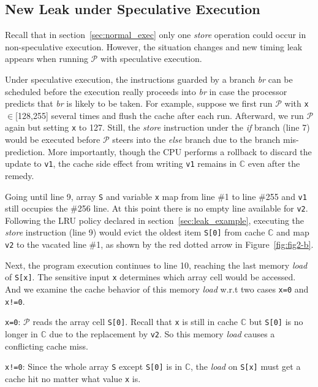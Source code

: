 \documentclass[sigconf]{acmart}
\newcommand{\prog}{\mathcal{P}}
\begin{document}
\subsection{New Leak under Speculative Execution}
\label{sec:specu_leak}

Recall that in section~\ref{sec:normal_exec} only one \textit{store} operation 
could occur in non-speculative execution. However, the situation changes and 
new timing leak appears when running $\prog$ with speculative execution.  


Under speculative execution, the instructions guarded by a branch \emph{br} 
can be scheduled before the execution really proceeds into \emph{br} in case
the processor predicts that \emph{br} is likely to be taken. For example, suppose 
we first run $\prog$ with \texttt{x}$\in$[128,255] several times and flush the 
cache after each run. Afterward, we run $\prog$ again but setting \texttt{x} 
to 127. Still, the \textit{store} instruction under the \emph{if} branch (line 
7) would be executed before $\prog$ steers into the \emph{else} branch due to 
the branch mis-prediction. More importantly, though the CPU performs a rollback 
to discard the update to \texttt{v1}, the cache side effect from writing 
\texttt{v1} remains in $\mathbb{C}$ even after the remedy. 


Going until line 9, array \texttt{S} and variable \texttt{x} map from line 
\#1 to line \#255 and \texttt{v1} still occupies the \#256 line. At this 
point there is no empty line available for \texttt{v2}. Following the LRU 
policy declared in section~\ref{sec:leak_example}, executing the \textit{store}
instruction (line 9) would evict the oldest item \texttt{S[0]} from cache 
$\mathbb{C}$ and map \texttt{v2} to the vacated line \#1, as shown by the red dotted
arrow in Figure~\ref{fig:fig2-b}.


Next, the program execution continues to line 10, reaching the last memory 
\textit{load} of \texttt{S[x]}. The sensitive input \texttt{x} determines which 
array cell would be accessed. And we examine the cache behavior of this 
memory \textit{load} w.r.t two cases \texttt{x=0} and \texttt{x!=0}.


\begin{itemize*}
  \item \texttt{x=0}: $\prog$ reads the array cell \texttt{S[0]}. Recall that
    \texttt{x} is still in cache $\mathbb{C}$ but \texttt{S[0]} is no longer in 
		$\mathbb{C}$ due to the replacement by \texttt{v2}. So this memory \textit{load} 
		causes a conflicting cache miss.
  \item \texttt{x!=0}: Since the whole array \texttt{S} except \texttt{S[0]}
    is in $\mathbb{C}$, the \textit{load} on \texttt{S[x]} must get a cache hit no 
    matter what value \texttt{x} is.
\end{itemize*}
\end{document}
